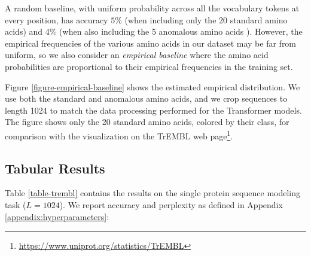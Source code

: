 A random baseline, with uniform probability across all the vocabulary tokens at every position, has accuracy $5\%$ (when including only the 20 standard amino acids) and $4\%$ (when also including the 5 anomalous amino acids \citep{uniprot2019uniprot}). However, the empirical frequencies of the various amino acids in our dataset may be far from uniform, so we also consider an \textit{empirical baseline} where the amino acid probabilities are proportional to their empirical frequencies in the training set.

Figure \ref{figure-empirical-baseline} shows the estimated empirical distribution. We use both the standard and anomalous amino acids, and we crop sequences to length 1024 to match the data processing performed for the Transformer models. The figure shows only the 20 standard amino acids, colored by their class, for comparison with the visualization on the TrEMBL web page\footnote{\url{https://www.uniprot.org/statistics/TrEMBL}}.

\subsection{Tabular Results}

Table \ref{table-trembl} contains the results on the single protein sequence modeling task ($L=1024$). We report accuracy and perplexity as defined in Appendix \ref{appendix:hyperparameters}:


